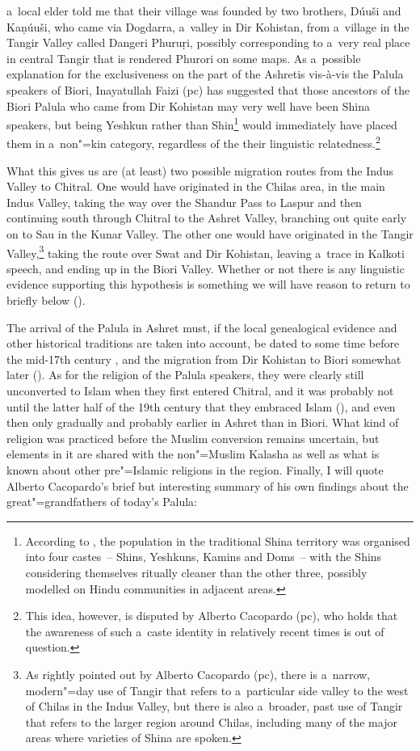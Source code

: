 a~local elder told me that their village was founded by two brothers, Dúuši‌ and ‌Kaṇúuši, who came
via Dogdarra, a~valley in Dir Kohistan, from a~village in the Tangir Valley called Dangeri Phuruṛi,
possibly corresponding to a~very real place in central Tangir that is rendered Phurori on some
maps. As a~possible explanation for the exclusiveness on the part of the Ashretis vis-à-vis the
Palula speakers of Biori, Inayatullah Faizi (pc) has suggested that those ancestors of the Biori
Palula who came from Dir Kohistan may very well have been Shina speakers, but being Yeshkun rather
than Shin\footnote{According to \citet[17]{jettmar2002}, the population in the traditional Shina
  territory was organised into four castes~-- Shins, Yeshkuns, Kamins and Doms~-- with the Shins
  considering themselves ritually cleaner than the other three, possibly modelled on Hindu
  communities in adjacent areas. } would immediately have placed them in a~non"=kin category,
regardless of the their linguistic relatedness.\footnote{This idea, however, is disputed by Alberto
  Cacopardo (pc), who holds that the awareness of such a~caste identity in relatively recent times
  is out of question.}


What this gives us are (at least) two possible migration routes from the Indus Valley to
Chitral. One would have originated in the Chilas area, in the main Indus Valley, taking the way over
the Shandur Pass to Laspur and then continuing south through Chitral to the Ashret Valley, branching
out quite early on to Sau in the Kunar Valley. The other one would have originated in the Tangir
Valley,\footnote{As rightly pointed out by Alberto Cacopardo (pc), there is a~narrow, modern"=day use
  of Tangir that refers to a~particular side valley to the west of Chilas in the Indus Valley, but
  there is also a~broader, past use of Tangir that refers to the larger region around Chilas,
  including many of the major areas where varieties of Shina are spoken.} taking the route over
Swat and Dir Kohistan, leaving a~trace in Kalkoti speech, and ending up in the Biori Valley. Whether or
not there is any linguistic evidence supporting this hypothesis is something we will have reason to
return to briefly below ().


The arrival of the Palula in Ashret must, if the local genealogical evidence and other historical
traditions are taken into account, be dated to some time before the mid-17th century \citep[88]{cacopardo2001}, and the migration from Dir Kohistan to Biori somewhat later
(\citeyear[118]{cacopardo2001}). As for the religion of the Palula speakers, they were clearly still
unconverted to Islam when they first entered Chitral, and it was probably not until the latter half
of the 19th century that they embraced Islam (\citeyear[83]{cacopardo2001}), and
even then only gradually and probably earlier in Ashret than in Biori. What kind of religion was
practiced before the Muslim conversion remains uncertain, but elements in it are shared with the
non"=Muslim Kalasha as well as what is known about other pre"=Islamic religions in the region. Finally, I will quote Alberto Cacopardo's brief but interesting summary of his own findings about the great"=grandfathers of today's Palula:

